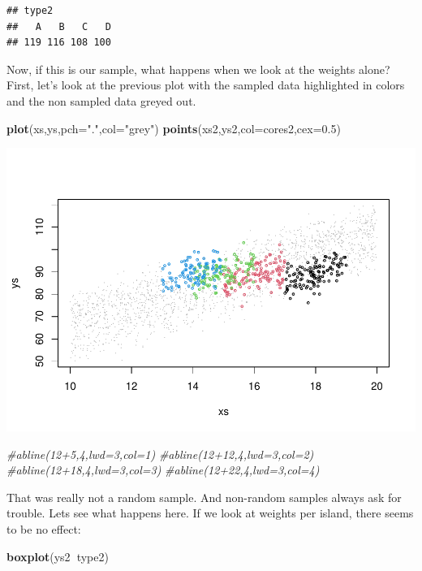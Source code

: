 \documentclass[
]{book}
\newenvironment{Shaded}{\begin{snugshade}}{\end{snugshade}}
\newcommand{\CommentTok}[1]{\textcolor[rgb]{0.56,0.35,0.01}{\textit{#1}}}
\newcommand{\DataTypeTok}[1]{\textcolor[rgb]{0.13,0.29,0.53}{#1}}
\newcommand{\FloatTok}[1]{\textcolor[rgb]{0.00,0.00,0.81}{#1}}
\newcommand{\KeywordTok}[1]{\textcolor[rgb]{0.13,0.29,0.53}{\textbf{#1}}}
\newcommand{\NormalTok}[1]{#1}
\newcommand{\OperatorTok}[1]{\textcolor[rgb]{0.81,0.36,0.00}{\textbf{#1}}}
\newcommand{\StringTok}[1]{\textcolor[rgb]{0.31,0.60,0.02}{#1}}
\begin{document}
\begin{verbatim}
## type2
##   A   B   C   D 
## 119 116 108 100
\end{verbatim}

Now, if this is our sample, what happens when we look at the weights alone? First, let's look at the previous plot with the sampled data highlighted in colors and the non sampled data greyed out.

\begin{Shaded}
\begin{Highlighting}[]
\KeywordTok{plot}\NormalTok{(xs,ys,}\DataTypeTok{pch=}\StringTok{"."}\NormalTok{,}\DataTypeTok{col=}\StringTok{"grey"}\NormalTok{)}
\KeywordTok{points}\NormalTok{(xs2,ys2,}\DataTypeTok{col=}\NormalTok{cores2,}\DataTypeTok{cex=}\FloatTok{0.5}\NormalTok{)}
\end{Highlighting}
\end{Shaded}

\includegraphics{ECOMODbook_files/figure-latex/a10.11-1.pdf}

\begin{Shaded}
\begin{Highlighting}[]
\CommentTok{#abline(12+5,4,lwd=3,col=1)}
\CommentTok{#abline(12+12,4,lwd=3,col=2)}
\CommentTok{#abline(12+18,4,lwd=3,col=3)}
\CommentTok{#abline(12+22,4,lwd=3,col=4)}
\end{Highlighting}
\end{Shaded}

That was really not a random sample. And non-random samples always ask for trouble. Lets see what happens here. If we look at weights per island, there seems to be no effect:

\begin{Shaded}
\begin{Highlighting}[]
\KeywordTok{boxplot}\NormalTok{(ys2}\OperatorTok{~}\NormalTok{type2)}
\end{Highlighting}
\end{Shaded}
\end{document}
